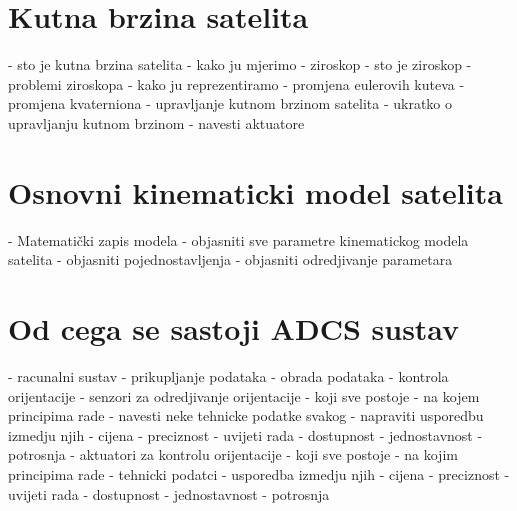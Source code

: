 \documentclass[times, utf8, diplomski, numeric]{templates/template}
\begin{document}
{    \section{Kutna brzina satelita}{
        - sto je kutna brzina satelita
        - kako ju mjerimo
            - ziroskop
            - sto je ziroskop
            - problemi ziroskopa
        - kako ju reprezentiramo
            - promjena eulerovih kuteva
            - promjena kvaterniona
        - upravljanje kutnom brzinom satelita
            - ukratko o upravljanju kutnom brzinom
            - navesti aktuatore
    }

    \section{Osnovni kinematicki model satelita}{
        - Matematički zapis modela
        - objasniti sve parametre kinematickog modela satelita
        - objasniti pojednostavljenja
        - objasniti odredjivanje parametara
    }

    \section{Od cega se sastoji ADCS sustav}{
        - racunalni sustav
            - prikupljanje podataka
            - obrada podataka
            - kontrola orijentacije
        - senzori za odredjivanje orijentacije
            - koji sve postoje
            - na kojem principima rade
            - navesti neke tehnicke podatke svakog
            - napraviti usporedbu izmedju njih
                - cijena
                - preciznost
                - uvijeti rada
                - dostupnost
                - jednostavnost
                - potrosnja
        - aktuatori za kontrolu orijentacije
            - koji sve postoje
            - na kojim principima rade
            - tehnicki podatci
            - usporedba izmedju njih
                - cijena
                - preciznost
                - uvijeti rada
                - dostupnost
                - jednostavnost
                - potrosnja
    }
}
\end{document}
